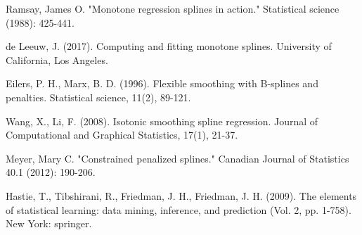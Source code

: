 \documentclass{article}
\begin{document}
	\begin{thebibliography}{9}
		\label{iSpline}
		Ramsay, James O. "Monotone regression splines in action." Statistical science (1988): 425-441.
		
		\label{ComputingISpline}
		de Leeuw, J. (2017). Computing and fitting monotone splines. University of California, Los Angeles.
		
		\label{pSpline}
		Eilers, P. H., Marx, B. D. (1996). Flexible smoothing with B-splines and penalties. Statistical science, 11(2), 89-121.
		
		\label{SOCPSpline}
		Wang, X., Li, F. (2008). Isotonic smoothing spline regression. Journal of Computational and Graphical Statistics, 17(1), 21-37.
		
		\label{constrainedSplines}
		Meyer, Mary C. "Constrained penalized splines." Canadian Journal of Statistics 40.1 (2012): 190-206.
		
		\label{ESL}
		Hastie, T., Tibshirani, R., Friedman, J. H., Friedman, J. H. (2009). The elements of statistical learning: data mining, inference, and prediction (Vol. 2, pp. 1-758). New York: springer.
		

		
	\end{thebibliography}
	
\end{document}
